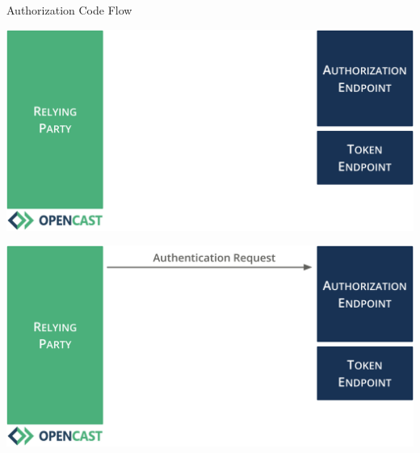 \documentclass[aspectratio=169]{beamer}
\begin{document}
\begin{frame}{Authorization Code Flow}
	\vspace*{0.2em}
	\begin{overprint}
		\centerline{\includegraphics[height=0.84\textheight]{figures/authorization-code-flow-1}}
		\centerline{\includegraphics[height=0.84\textheight]{figures/authorization-code-flow-2}}
	\end{overprint}
	\vspace{-1.8em}
\end{frame}
\end{document}
